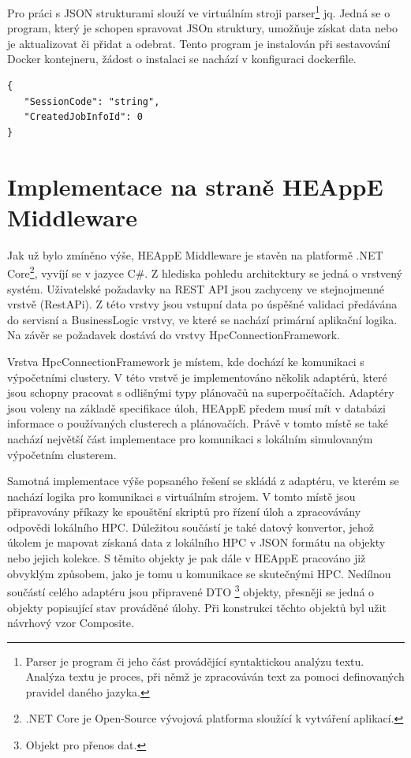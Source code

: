 Pro práci s JSON strukturami slouží ve virtuálním stroji parser\footnote{Parser je program či jeho část provádějící syntaktickou analýzu textu. Analýza textu je proces, při němž je zpracováván text za pomoci definovaných pravidel daného jazyka.\cite{uEN4MdNhBpkZmkHF}} jq\cite{qibOqajDMnKYNjXq}. Jedná se o program, který je schopen spravovat JSOn struktury, umožňuje získat data nebo je aktualizovat či přidat a odebrat. Tento program je instalován při sestavování Docker kontejneru, žádost o instalaci se nachází v konfiguraci dockerfile.

\hfill \break
\begin{lstlisting}[caption={Příklad JSON struktury}]
{
   "SessionCode": "string",
   "CreatedJobInfoId": 0
}
\end{lstlisting}

\section{Implementace na straně HEAppE Middleware}
Jak už bylo zmíněno výše, HEAppE Middleware je stavěn na platformě .NET Core\footnote{.NET Core je Open-Source vývojová platforma sloužící k vytváření aplikací.}, vyvíjí se v jazyce C\#. Z hlediska pohledu architektury se jedná o vrstvený systém. Uživatelské požadavky na REST API jsou zachyceny ve stejnojmenné vrstvě (RestAPi). Z této vrstvy jsou vstupní data po úspěšné validaci předávána do servisní a BusinessLogic vrstvy, ve které se nachází primární aplikační logika. Na závěr se požadavek dostává do vrstvy HpcConnectionFramework.

Vrstva HpcConnectionFramework je místem, kde dochází ke komunikaci s výpočetními clustery. V této vrstvě je implementováno několik adaptérů, které jsou schopny pracovat s odlišnými typy plánovačů na superpočítačích. Adaptéry jsou voleny na základě specifikace úloh, HEAppE předem musí mít v databázi informace o používaných clusterech a plánovačích. Právě v tomto místě se také nachází největší část implementace pro komunikaci s lokálním simulovaným výpočetním clusterem.

Samotná implementace výše popsaného řešení se skládá z adaptéru, ve kterém se nachází logika pro komunikaci s virtuálním strojem. V tomto místě jsou připravovány příkazy ke spouštění skriptů pro řízení úloh a zpracovávány odpovědi lokálního HPC. Důležitou součástí je také datový konvertor, jehož úkolem je mapovat získaná data z lokálního HPC v JSON formátu na objekty nebo jejich kolekce. S těmito objekty je pak dále v HEAppE pracováno již obvyklým způsobem, jako je tomu u komunikace se skutečnými HPC. Nedílnou součástí celého adaptéru jsou připravené DTO \footnote{Objekt pro přenos dat.} objekty, přesněji se jedná o objekty popisující stav prováděné úlohy. Při konstrukci těchto objektů byl užit návrhový vzor Composite.

